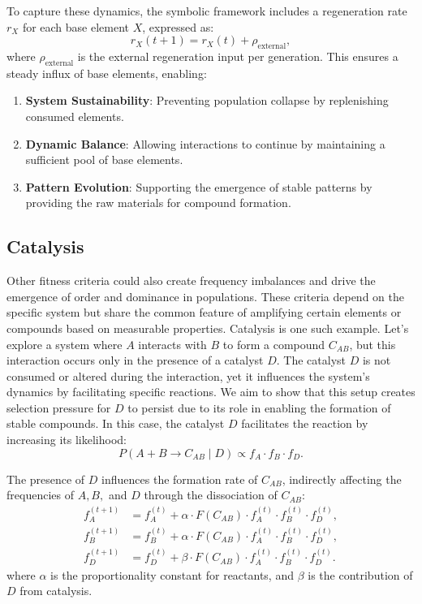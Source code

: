 \documentclass[entropy,article,submit,pdftex,moreauthors]{Definitions/mdpi}
\begin{document}
To capture these dynamics, the symbolic framework includes a regeneration rate \( r_X \) for each base element \( X \), expressed as:
\begin{equation}
r_X(t+1) = r_X(t) + \rho_{\text{external}},
\end{equation}
where \( \rho_{\text{external}} \) is the external regeneration input per generation. This ensures a steady influx of base elements, enabling:
\begin{enumerate}
    \item \textbf{System Sustainability}: Preventing population collapse by replenishing consumed elements.
    \item \textbf{Dynamic Balance}: Allowing interactions to continue by maintaining a sufficient pool of base elements.
    \item \textbf{Pattern Evolution}: Supporting the emergence of stable patterns by providing the raw materials for compound formation.
\end{enumerate}


\subsection{Catalysis}

Other fitness criteria could also create frequency imbalances and drive the emergence of order and dominance in populations. These criteria depend on the specific system but share the common feature of amplifying certain elements or compounds based on measurable properties. Catalysis is one such example. Let's explore a system where \( A \) interacts with \( B \) to form a compound \( C_{AB} \), but this interaction occurs only in the presence of a catalyst \( D \). The catalyst \( D \) is not consumed or altered during the interaction, yet it influences the system's dynamics by facilitating specific reactions. We aim to show that this setup creates selection pressure for \( D \) to persist due to its role in enabling the formation of stable compounds. In this case, the catalyst \( D \) facilitates the reaction by increasing its likelihood:
\[
P(A + B \to C_{AB} \mid D) \propto f_A \cdot f_B \cdot f_D.
\]

The presence of \( D \) influences the formation rate of \( C_{AB} \), indirectly affecting the frequencies of \( A, B, \) and \( D \) through the dissociation of \( C_{AB} \):
\begin{align*}
f_A^{(t+1)} &= f_A^{(t)} + \alpha \cdot F(C_{AB}) \cdot f_A^{(t)} \cdot f_B^{(t)} \cdot f_D^{(t)}, \\
f_B^{(t+1)} &= f_B^{(t)} + \alpha \cdot F(C_{AB}) \cdot f_A^{(t)} \cdot f_B^{(t)} \cdot f_D^{(t)}, \\
f_D^{(t+1)} &= f_D^{(t)} + \beta \cdot F(C_{AB}) \cdot f_A^{(t)} \cdot f_B^{(t)} \cdot f_D^{(t)}.
\end{align*}
where \( \alpha \) is the proportionality constant for reactants, and \( \beta \) is the contribution of \( D \) from catalysis.
\end{document}
